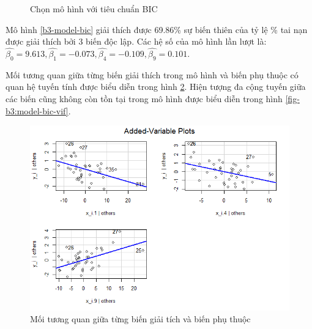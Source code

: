 \begin{figure}[H]
	\centering
	\hfill
	\caption{Chọn mô hình với tiêu chuẩn BIC}
	\label{fig-b3:model-bic}
\end{figure}

Mô hình \ref{b3-model-bic} giải thích được 69.86\% sự biến thiên của tỷ lệ \% tai nạn được giải thích bởi 3 biến độc lập. Các hệ số của mô hình lần lượt là: $\hat{\beta_0}=9.613, \hat{\beta_1}=-0.073, \hat{\beta_4}=-0.109, \hat{\beta_9}=0.101$.

Mối tương quan giữa từng biến giải thích trong mô hình và biến phụ thuộc có quan hệ tuyến tính được biểu diễn trong hình \ref{fig-b3:model-bic-vars}. Hiện tượng đa cộng tuyến giữa các biến cũng không còn tồn tại trong mô hình được biểu diễn trong hình \ref{fig-b3:model-bic-vif}.
\begin{figure}[H]
	\centering
	\includegraphics[width=0.65\linewidth]{images/B3/model-bic-vars}
	\caption{Mối tương quan giữa từng biến giải tích và biến phụ thuộc}
	\label{fig-b3:model-bic-vars}
\end{figure}

